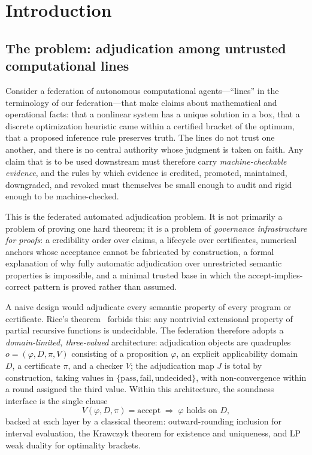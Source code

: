 \documentclass[11pt]{article}
\theoremstyle{definition}
\theoremstyle{remark}
\begin{document}
\tableofcontents

\section{Introduction}\label{sec:intro}

\subsection{The problem: adjudication among untrusted computational lines}

Consider a federation of autonomous computational agents---``lines'' in the
terminology of our federation---that make claims about mathematical and
operational facts: that a nonlinear system has a unique solution in a box,
that a discrete optimization heuristic came within a certified bracket of the
optimum, that a proposed inference rule preserves truth. The lines do not
trust one another, and there is no central authority whose judgment is taken
on faith. Any claim that is to be used downstream must therefore carry
\emph{machine-checkable evidence}, and the rules by which evidence is
credited, promoted, maintained, downgraded, and revoked must themselves be
small enough to audit and rigid enough to be machine-checked.

This is the federated automated adjudication problem. It is not primarily a
problem of proving one hard theorem; it is a problem of \emph{governance
infrastructure for proofs}: a credibility order over claims, a lifecycle over
certificates, numerical anchors whose acceptance cannot be fabricated by
construction, a formal explanation of why fully automatic adjudication over
unrestricted semantic properties is impossible, and a minimal trusted base in
which the accept-implies-correct pattern is proved rather than assumed.

A naive design would adjudicate every semantic property of every program or
certificate. Rice's theorem~\cite{rice1953} forbids this: any nontrivial
extensional property of partial recursive functions is undecidable. The
federation therefore adopts a \emph{domain-limited, three-valued}
architecture: adjudication objects are quadruples
$o=(\varphi, D, \pi, V)$ consisting of a proposition $\varphi$, an explicit
applicability domain $D$, a certificate $\pi$, and a checker $V$; the
adjudication map $J$ is total by construction, taking values in
$\{\mathrm{pass}, \mathrm{fail}, \mathrm{undecided}\}$, with non-convergence
within a round assigned the third value. Within this architecture, the
soundness interface is the single clause
\[
V(\varphi, D, \pi) = \mathrm{accept} \;\Longrightarrow\; \varphi \text{ holds on } D,
\]
backed at each layer by a classical theorem: outward-rounding inclusion for
interval evaluation, the Krawczyk theorem for existence and uniqueness, and
LP weak duality for optimality brackets.
\end{document}
